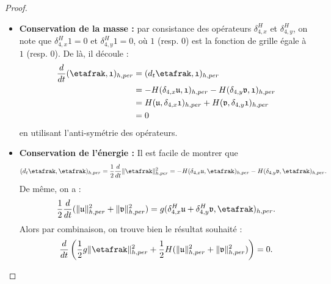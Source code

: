 \begin{proof}
\begin{itemize}
\item \textbf{Conservation de la masse :}
par consistance des opérateurs $\delta_{4,x}^H$ et $\delta_{4,y}^H$, on note que $\delta_{4,x}^H \mathfrak{1} = \mathfrak{0}$ et $\delta_{4,y}^H \mathfrak{1} = \mathfrak{0}$, où $\mathfrak{1}$ (resp. $\mathfrak{0}$) est la fonction de grille égale à $1$ (resp. $0$). De là, il découle :
\begin{align*}
\dfrac{d}{dt} (\etafrak, \mathfrak{1})_{h,per} & = ( d_t \etafrak, \mathfrak{1} )_{h,per} \\
	& = - H (\delta_{4,x} \mathfrak{u}, \mathfrak{1})_{h,per} - H (\delta_{4,y} \mathfrak{v}, \mathfrak{1})_{h,per} \\
	& = H (\mathfrak{u}, \delta_{4,x} \mathfrak{1})_{h,per} + H (\mathfrak{v}, \delta_{4,y} \mathfrak{1})_{h,per} \\
	& = 0
\end{align*}
en utilisant l'anti-symétrie des opérateurs.

\item \textbf{Conservation de l'énergie :}
Il est facile de montrer que 
\begin{equation}
(d_t \etafrak, \etafrak)_{h,per} = \dfrac{1}{2} \dfrac{d}{dt} \| \etafrak \|^2_{h,per} = - H (\delta_{4,x} \mathfrak{u}, \etafrak)_{h,per} - H (\delta_{4,y} \mathfrak{v}, \etafrak)_{h,per}.
\end{equation}
De même, on a :
\begin{equation}
\dfrac{1}{2} \dfrac{d}{dt} (\| \mathfrak{u} \|_{h,per}^2 + \| \mathfrak{v} \|_{h,per}^2) = g (\delta_{4,x}^H \mathfrak{u}+\delta_{4,y}^H \mathfrak{v}, \etafrak)_{h,per}.
\end{equation}
Alors par combinaison, on trouve bien le résultat souhaité :
\begin{equation}
\dfrac{d}{dt} \left( \dfrac{1}{2} g \| \etafrak \|_{h,per}^2 + \dfrac{1}{2} H ( \| \mathfrak{u} \|_{h,per}^2 +  \| \mathfrak{v} \|_{h,per}^2) \right) = 0.
\end{equation}
\end{itemize}
\end{proof}

